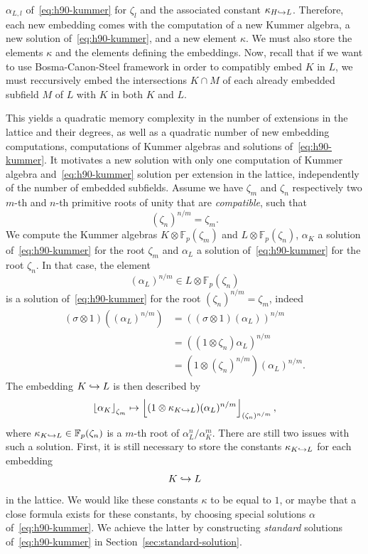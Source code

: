 $\alpha_{L, l}$ of~\eqref{eq:h90-kummer} for $\zeta_l$ and the associated
constant $\kappa_{H\hookrightarrow L}$. Therefore, each new embedding comes with the
computation of a new Kummer algebra, a new solution of~\eqref{eq:h90-kummer}, and a
new element $\kappa$. We must also store the elements $\kappa$ and the elements
defining the embeddings. Now, recall that if we want to use Bosma-Canon-Steel
framework in order to compatibly embed $K$ in $L$, we must reccursively embed
the intersections $K\cap M$ of each already embedded subfield $M$ of $L$ with $K$ in both $K$
and $L$.
\begin{center}
\end{center}
This yields a quadratic memory complexity in the number of extensions in the
lattice and their degrees, as well as a quadratic number of new embedding
computations, \ie computations of Kummer algebras and solutions
of~\eqref{eq:h90-kummer}. It motivates a new solution with only one computation
of Kummer algebra and~\eqref{eq:h90-kummer} solution per extension in the lattice,
independently of the number of embedded subfields. Assume we have $\zeta_m$ and
$\zeta_n$ respectively two $m$-th and $n$-th primitive roots
of unity that are \emph{compatible}, \ie such that
\[
  (\zeta_n)^{n/m} = \zeta_m.
\]
We compute the Kummer algebras $K\otimes\mathbb{F}_{p}(\zeta_m)$ and
$L\otimes\mathbb{F}_p(\zeta_n)$, $\alpha_K$ a solution of~\eqref{eq:h90-kummer}
for the root $\zeta_m$ and $\alpha_L$ a solution of~\eqref{eq:h90-kummer} for
the root $\zeta_n$. In that case, the element
\[
  (\alpha_L)^{n/m}\in L\otimes\mathbb{F}_p(\zeta_n)
\]
is a solution of~\eqref{eq:h90-kummer} for the root $(\zeta_n)^{n/m}=\zeta_m$,
indeed
\begin{align*}
  (\sigma\otimes1)((\alpha_L)^{n/m}) &=
  ( (\sigma\otimes1)(\alpha_{L}))^{n/m} \\
  &= ( (1\otimes\zeta_n)\alpha_L)^{n/m}\\
  &= (1\otimes (\zeta_n)^{n/m})(\alpha_L)^{n/m}.
\end{align*}
The embedding $K\hookrightarrow L$ is then described by
\[
  \left\lfloor \alpha_K \right\rfloor_{\zeta_m}\mapsto\left\lfloor (1\otimes\kappa_{K\hookrightarrow
  L})(\alpha_L)^{n/m} \right\rfloor_{(\zeta_n)^{n/m}},
\]
where $\kappa_{K\hookrightarrow L}\in\mathbb{F}_p(\zeta_n)$ is a $m$-th root of
$\alpha_L^n/\alpha_K^m$. There are still two issues with such a solution. First,
it is still necessary to store the constants $\kappa_{K\hookrightarrow L}$ for each
embedding
\[
  K\hookrightarrow L
\]
in the lattice. We would like these constants $\kappa$ to be equal to $1$, or
maybe that a close formula exists for these constants, by choosing special
solutions $\alpha$ of~\eqref{eq:h90-kummer}. We achieve the latter
by constructing \emph{standard} solutions of~\eqref{eq:h90-kummer} in
Section~\ref{sec:standard-solution}.

